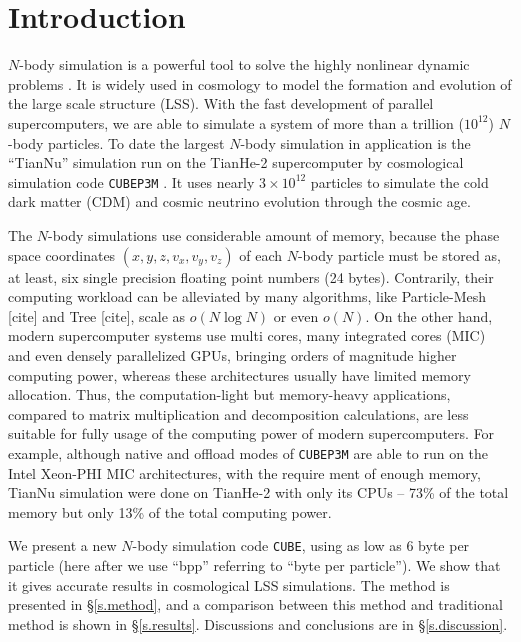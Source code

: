 \documentclass[10pt,twocolumn,preprint]{emulateapj}
\begin{document}
\section{Introduction}\label{s.intro}
$N$-body simulation is a powerful tool to solve the highly nonlinear dynamic problems 
\citep{1988csup.book.....H}. It is widely used in cosmology to model the formation and 
evolution of the large scale structure (LSS). With the fast development of parallel 
supercomputers, we are able to simulate a system of more than a trillion ($10^{12}$) 
$N$-body particles. To date the largest $N$-body simulation in application is the 
``TianNu'' simulation \citep{2017NatAs...1E.143Y,2017RAA....17...85E} run on the 
TianHe-2 supercomputer by cosmological simulation code 
{\tt CUBEP3M} \citep{2013MNRAS.436..540H}. It uses nearly $3\times 10^{12}$ particles 
to simulate the cold dark matter (CDM) and cosmic neutrino evolution through the 
cosmic age.

The $N$-body simulations use considerable amount of memory, because the phase space 
coordinates $(x,y,z,v_x,v_y,v_z)$ of each $N$-body particle must be stored as, at 
least, six single precision floating point numbers (24 bytes). Contrarily, their 
computing workload can be alleviated by many algorithms, like Particle-Mesh [cite] and 
Tree [cite], scale as $o(N\log N)$ or even $o(N)$. On the other hand, modern 
supercomputer systems use multi cores, many integrated cores (MIC) and even densely 
parallelized GPUs, bringing orders of magnitude higher computing power, whereas these 
architectures usually have limited memory allocation. Thus, the computation-light but 
memory-heavy applications, compared to matrix multiplication and decomposition 
calculations, are less suitable for fully usage of the computing power of modern 
supercomputers. For example, although native and offload modes of {\tt CUBEP3M} are 
able to run on the Intel Xeon-PHI MIC architectures, with the require ment of enough 
memory, TianNu simulation were done on TianHe-2 with only its CPUs -- 73\% of the 
total memory but only 13\% of the total computing power.

We present a new $N$-body simulation code {\tt CUBE}, using as low as 6 byte
per particle (here after we use ``bpp'' referring to ``byte per particle'').
We show that it gives accurate results in cosmological LSS simulations.
The method is presented in \S\ref{s.method}, and a comparison between this method
and traditional method is shown in \S\ref{s.results}. Discussions and 
conclusions are in \S\ref{s.discussion}.
\end{document}
